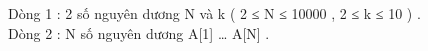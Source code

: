 Dòng 1 : 2 số nguyên dương N và k ( 2 ≤ N ≤ 10000 , 2 ≤ k ≤ 10 ) .   
\\   Dòng 2 : N số nguyên dương A[1] … A[N] .